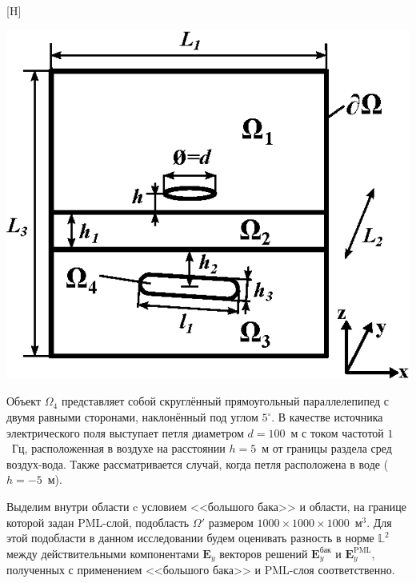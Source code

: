 \documentclass[a4paper,14pt]{article}
\makeatletter
\renewenvironment{figure}[1][\fps@figure]{
  \edef\@tempa{\noexpand\@float{figure}[#1]}
  \@tempa
  \addtocounter{foofigure}{1}
}{
  \end@float
}
\makeatother
\begin{document}
\begin{figure}[H]
	\centering
	\includegraphics[scale=1.5]{research-2/area_3layers/area_3layers_3.eps}
	\caption{расчётная область}
	\label{fig:res2:area}
\end{figure}

Объект $\Omega_4$ представляет собой скруглённый прямоугольный параллелепипед с двумя равными сторонами, наклонённый под углом $5^{\circ}$. В качестве источника электрического поля выступает петля диаметром $d = 100$~м с током частотой $1$~Гц, расположенная в воздухе на расстоянии $h = 5$~м от границы раздела сред воздух-вода. Также рассматривается случай, когда петля расположена в воде ($h = -5$~м).

Выделим внутри области c условием <<большого бака>> и области, на границе которой задан PML-слой, подобласть $\Omega'$ размером $1000 \times 1000 \times 1000$~м${}^3$. Для этой подобласти в данном исследовании будем оценивать разность в норме $\mathbb{L}^2$ между действительными компонентами $\mathbf{E}_y$ векторов решений $\mathbf{E}_y^{\text{бак}}$ и $\mathbf{E}_y^{\text{PML}}$, полученных с применением <<большого бака>> и PML-слоя соответственно.
\end{document}
